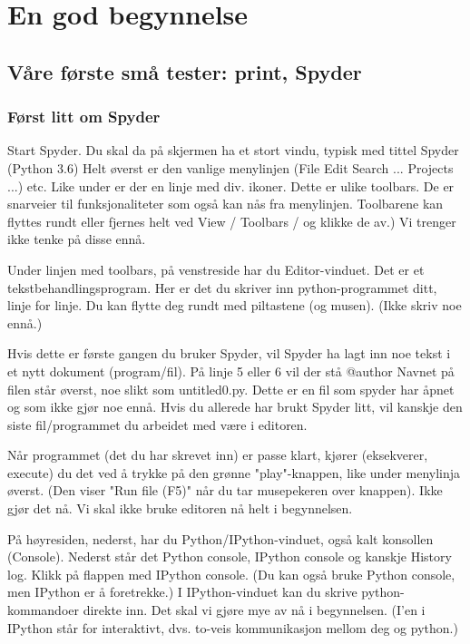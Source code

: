 \chapter{En god begynnelse}
\section{Våre første små tester: print, Spyder}
\subsection*{Først litt om Spyder}
Start Spyder. Du skal da på skjermen ha et stort vindu, typisk med tittel Spyder (Python 3.6)
Helt øverst er den vanlige menylinjen (File Edit Search ... Projects ...) etc.
Like under er der en linje med div. ikoner. Dette er ulike toolbars.
De er snarveier til funksjonaliteter som også kan nås fra menylinjen. 
Toolbarene kan flyttes rundt eller fjernes helt ved View / Toolbars / og klikke de av.)
Vi trenger ikke tenke på disse ennå. 

Under linjen med toolbars, på venstreside har du Editor-vinduet.
Det er et tekstbehandlingsprogram. 
Her er det du skriver inn python-programmet ditt, linje for linje.
Du kan flytte deg rundt med piltastene (og musen).
(Ikke skriv noe ennå.) 

Hvis dette er første gangen du bruker Spyder, vil Spyder ha lagt inn noe tekst
i et nytt dokument (program/fil).
På linje 5 eller 6 vil der stå @author 
Navnet på filen står øverst, noe slikt som untitled0.py. 
Dette er en fil som spyder har åpnet og som ikke gjør noe ennå. 
Hvis du allerede har brukt Spyder litt, vil kanskje den siste fil/programmet
du arbeidet med være i editoren.

Når programmet (det du har skrevet inn) er passe klart, kjører (eksekverer, execute)
du det ved å trykke på den grønne "play"-knappen, like under menylinja øverst.
(Den viser "Run file (F5)" når du tar musepekeren over knappen).
Ikke gjør det nå. Vi skal ikke bruke editoren nå helt i begynnelsen.


På høyresiden, nederst, har du Python/IPython-vinduet, også kalt konsollen (Console).
Nederst står det Python console, IPython console og kanskje History log. 
Klikk på flappen med IPython console.
(Du kan også bruke Python console, men IPython er å foretrekke.) 
I IPython-vinduet kan du skrive python-kommandoer direkte inn. 
Det skal vi gjøre mye av nå i begynnelsen. 
(I'en i IPython står for interaktivt, dvs. to-veis kommunikasjon mellom deg og python.) 


